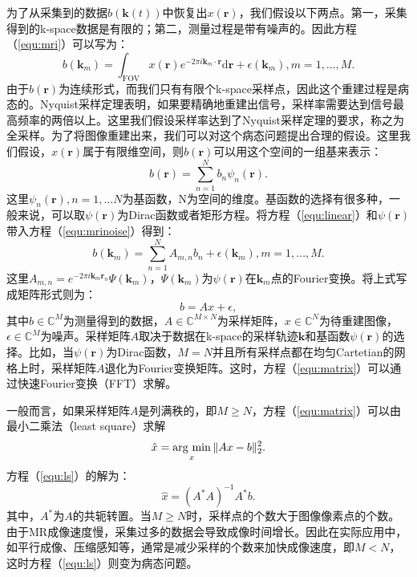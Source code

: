 为了从采集到的数据$b(\mathrm{\textbf{k}}(t))$中恢复出$x(\mathrm{\textbf{r}})$，我们假设以下两点。第一，采集得到的k-space数据是有限的；第二，测量过程是带有噪声的。因此方程（\ref{equ:mri}）可以写为：
\begin{equation}
	b(\mathrm{\textbf{k}}_m) = \int_{\mathrm{FOV}} x(\textbf{r})e^{-2\pi i \mathrm{\textbf{k}}_m \cdot \mathrm{\textbf{r}}}\mathrm{d}\mathrm{\textbf{r}} + \epsilon(\mathrm{\textbf{k}}_m), m=1,...,M.
	\label{equ:mrinoise}
\end{equation}
由于$b(\mathrm{\textbf{r}})$为连续形式，而我们只有有限个k-space采样点，因此这个重建过程是病态的。Nyquist采样定理表明，如果要精确地重建出信号，采样率需要达到信号最高频率的两倍以上。这里我们假设采样率达到了Nyquist采样定理的要求，称之为全采样。为了将图像重建出来，我们可以对这个病态问题提出合理的假设。这里我们假设，$x(\mathrm{\textbf{r}})$属于有限维空间，则$b(\mathrm{\textbf{r}})$可以用这个空间的一组基来表示：
\begin{equation}
	b(\mathrm{\textbf{r}})=\sum_{n=1}^N b_n\psi_n(\mathrm{\textbf{r}}).
	\label{equ:linear}
\end{equation}
这里$\psi_{n}(\mathrm{\textbf{r}}), n=1,...N$为基函数，N为空间的维度。基函数的选择有很多种，一般来说，可以取$\psi(\mathrm{\textbf{r}})$为Dirac函数或者矩形方程。将方程（\ref{equ:linear}）和$\psi(\mathrm{\textbf{r}})$带入方程（\ref{equ:mrinoise}）得到：
\begin{equation}
	b(\mathrm{\textbf{k}}_m) = \sum_{n=1}^N A_{m,n}b_n + \epsilon(\mathrm{\textbf{k}}_m), m=1,...,M.
\end{equation}
这里$A_{m,n}=e^{-2\pi i\mathrm{\textbf{k}}_m\mathrm{\textbf{r}}_n}\Psi(\mathrm{\textbf{k}}_m)$，$\Psi(\mathrm{\textbf{k}}_m)$为$\psi(\mathrm{\textbf{r}})$在$\mathrm{\textbf{k}}_m$点的Fourier变换。将上式写成矩阵形式则为：
\begin{equation}
	b=Ax+\epsilon,
	\label{equ:matrix}
\end{equation}
其中$b\in \mathbb{C}^M$为测量得到的数据，$A\in \mathbb{C}^{M\times N}$为采样矩阵，$x\in \mathbb{C}^N$为待重建图像，$\epsilon \in \mathbb{C}^M$为噪声。采样矩阵$A$取决于数据在k-space的采样轨迹$\mathrm{\textbf{k}}$和基函数$\psi(\mathrm{\textbf{r}})$的选择。比如，当$\psi(\mathrm{\textbf{r}})$为Dirac函数，$M=N$并且所有采样点都在均匀Cartetian的网格上时，采样矩阵$A$退化为Fourier变换矩阵。这时，方程（\ref{equ:matrix}）可以通过快速Fourier变换（FFT）求解。

一般而言，如果采样矩阵$A$是列满秩的，即$M\geq N$，方程（\ref{equ:matrix}）可以由最小二乘法（least square）求解
\begin{equation}
	\hat{x} = \argmin_x \|Ax-b\|^2_2.
	\label{equ:ls}
\end{equation}
方程（\ref{equ:ls}）的解为：
\begin{equation}
	\hat{x} = (A^*A)^{-1}A^*b.
	\label{equ:lss}
\end{equation}
其中，$A^*$为$A$的共轭转置。当$M\geq N$时，采样点的个数大于图像像素点的个数。由于MR成像速度慢，采集过多的数据会导致成像时间增长。因此在实际应用中，如平行成像、压缩感知等，通常是减少采样的个数来加快成像速度，即$M<N$，这时方程（\ref{equ:ls}）则变为病态问题。

